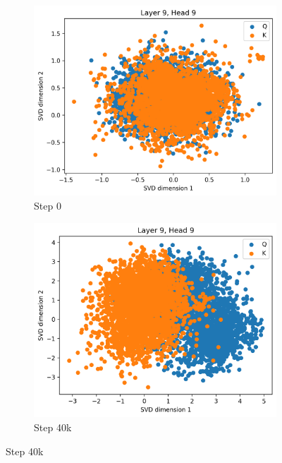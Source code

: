 \begin{figure}[ht]
    \centering
    \begin{subfigure}[b]{0.43\linewidth}
         \includegraphics[width=\linewidth]{sources/part_1/anisotropy/imgs/dist_l9h9_s0.png}
         \caption{Step 0}
         \label{fig:dist_qk_s0}
    \end{subfigure}
    \begin{subfigure}[b]{0.43\linewidth}
         \includegraphics[width=\linewidth]{sources/part_1/anisotropy/imgs/dist_l9h9_s40.png}
         \caption{Step 40k}
         \label{fig:dist_qk_s40}
    \end{subfigure}

\end{figure}
